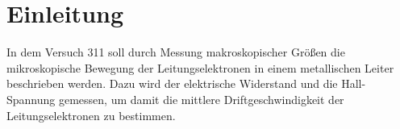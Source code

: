 \section{Einleitung}
\label{sec:Einleitung}
In dem Versuch 311 soll durch Messung makroskopischer Größen
die mikroskopische Bewegung der Leitungselektronen in einem 
metallischen Leiter beschrieben werden. Dazu wird der elektrische
Widerstand und die Hall-Spannung gemessen, um damit die 
mittlere Driftgeschwindigkeit der Leitungselektronen zu bestimmen.